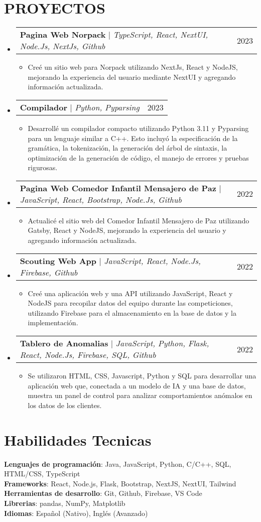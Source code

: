 \documentclass[letterpaper,11pt]{article}
\makeatletter
\newcommand{\resumeItem}[1]{
  \item\small{
    {#1 \vspace{-2pt}}
  }
}
\newcommand{\resumeProjectHeading}[2]{
    \item
    \begin{tabular*}{0.97\textwidth}{l@{\extracolsep{\fill}}r}
      \small#1 & #2 \\
    \end{tabular*}\vspace{-7pt}
}
\newcommand{\resumeSubHeadingListStart}{\begin{itemize}[leftmargin=0.15in, label={}]}
\newcommand{\resumeSubHeadingListEnd}{\end{itemize}}
\newcommand{\resumeItemListStart}{\begin{itemize}}
\newcommand{\resumeItemListEnd}{\end{itemize}\vspace{-5pt}}
\makeatother
\begin{document}
\section{PROYECTOS}
\resumeSubHeadingListStart
\resumeProjectHeading
{\textbf{Pagina Web Norpack} $|$ \emph{TypeScript, React, NextUI, Node.Js, NextJs, Github}}{2023}
\resumeItemListStart
\resumeItem{Creé un sitio web para Norpack utilizando NextJs, React y NodeJS, mejorando la experiencia del usuario mediante NextUI y agregando información actualizada.}
\resumeItemListEnd
\resumeProjectHeading
{\textbf{Compilador} $|$ \emph{Python, Pyparsing}}{2023}
\resumeItemListStart
\resumeItem{Desarrollé un compilador compacto utilizando Python 3.11 y Pyparsing para un lenguaje similar a C++. Esto incluyó la especificación de la gramática, la tokenización, la generación del árbol de sintaxis, la optimización de la generación de código, el manejo de errores y pruebas rigurosas.}
\resumeItemListEnd
\resumeProjectHeading
{\textbf{Pagina Web Comedor Infantil Mensajero de Paz} $|$ \emph{JavaScript, React, Bootstrap, Node.Js, Github}}{2022}
\resumeItemListStart
\resumeItem{Actualicé el sitio web del Comedor Infantil Mensajero de Paz utilizando Gatsby, React y NodeJS, mejorando la experiencia del usuario y agregando información actualizada.}
\resumeItemListEnd
\resumeProjectHeading
{\textbf{Scouting Web App} $|$ \emph{JavaScript, React, Node.Js, Firebase, Github}}{2022}
\resumeItemListStart
\resumeItem{Creé una aplicación web y una API utilizando JavaScript, React y NodeJS para recopilar datos del equipo durante las competiciones, utilizando Firebase para el almacenamiento en la base de datos y la implementación.}
\resumeItemListEnd
\resumeProjectHeading
{\textbf{Tablero de Anomalias} $|$ \emph{JavaScript, Python, Flask, React, Node.Js, Firebase, SQL, Github}}{2022}
\resumeItemListStart
\resumeItem{Se utilizaron HTML, CSS, Javascript, Python y SQL para desarrollar una aplicación web que, conectada a un modelo de IA y una base de datos, muestra un panel de control para analizar comportamientos anómalos en los datos de los clientes.}
\resumeItemListEnd
\resumeSubHeadingListEnd



%
\section{Habilidades Tecnicas}
\begin{itemize}[leftmargin=0.15in, label={}]
	\small{\item{
		            \textbf{Lenguajes de programación}{: Java, JavaScript, Python, C/C++, SQL, HTML/CSS, TypeScript} \\
		            \textbf{Frameworks}{: React, Node.js, Flask, Bootstrap, NextJS, NextUI, Tailwind} \\
		            \textbf{Herramientas de desarrollo}{: Git, Github, Firebase, VS Code} \\
		            \textbf{Librerias}{: pandas, NumPy, Matplotlib} \\
		            \textbf{Idiomas}{: Español (Nativo), Inglés (Avanzado)} \\
		      }}
\end{itemize}


\end{document}
